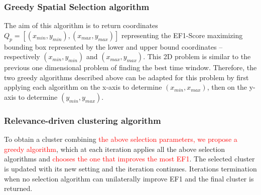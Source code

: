 

\subsubsection{Greedy Spatial Selection algorithm}

The aim of this algorithm is to return coordinates $Q_p=[(x_{min},y_{min}),(x_{max},y_{max})]$ representing the EF1-Score maximizing bounding box represented by the lower and upper bound coordinates -- respectively $(x_{min},y_{min})$ and $(x_{max},y_{max})$. This 2D problem is similar to the previous one dimensional problem of finding the best time window. Therefore, the two greedy algorithms described above can be adapted for this problem by first applying each algorithm on the x-axis to determine $(x_{min},x_{max})$, then on the y-axis to determine $(y_{min},y_{max})$. 


\subsubsection{Relevance-driven clustering algorithm} To obtain a cluster combining \textcolor{red}{ the above selection parameters, we propose a greedy algorithm}, which at each iteration applies all the above selection algorithms and \textcolor{red}{chooses the one that improves the most EF1}.  The selected cluster is updated with its new setting and the iteration continues.  Iterations termination when no selection algorithm can unilaterally improve EF1 and the final cluster is returned.

